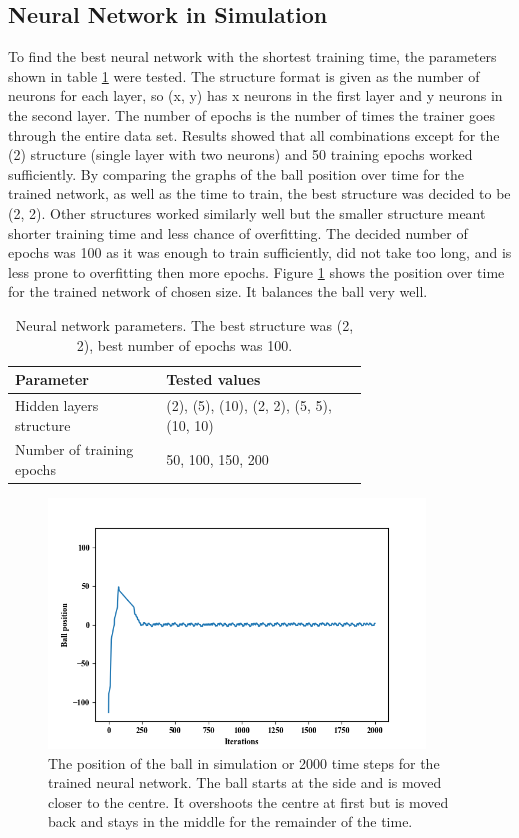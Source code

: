 \documentclass[12pt,a4paper]{article}
\begin{document}
\subsection{Neural Network in Simulation}
To find the best neural network with the shortest training time, the parameters shown in table \ref{nn_params} were tested. The structure format is given as the number of neurons for each layer, so (x, y) has x neurons in the first layer and y neurons in the second layer. The number of epochs is the number of times the trainer goes through the entire data set. Results showed that all combinations except for the (2) structure (single layer with two neurons) and 50 training epochs worked sufficiently. By comparing the graphs of the ball position over time for the trained network, as well as the time to train, the best structure was decided to be (2, 2). Other structures worked similarly well but the smaller structure meant shorter training time and less chance of overfitting. The decided number of epochs was 100 as it was enough to train sufficiently, did not take too long, and is less prone to overfitting then more epochs. Figure \ref{nn_param_test} shows the position over time for the trained network of chosen size. It balances the ball very well.
\begin{table}[htb]
\centering
\caption{Neural network parameters. The best structure was (2, 2), best number of epochs was 100.}
\label{nn_params}
\begin{tabular}{>{\raggedright}p{0.3\linewidth}p{0.4\linewidth}}\hline
Parameter & Tested values\\ \hline\hline
Hidden layers structure & (2), (5), (10), (2, 2), (5, 5), (10, 10)\\ \hline
Number of training epochs & 50, 100, 150, 200\\ \hline
\end{tabular}
\end{table}
\begin{figure}[H]
	\centering
	\includegraphics[width=10cm]{86_nn}
	\caption{The position of the ball in simulation or 2000 time steps for the trained neural network. The ball starts at the side and is moved closer to the centre. It overshoots the centre at first but is moved back and stays in the middle for the remainder of the time.}
	\label{nn_param_test}
\end{figure}
\end{document}
